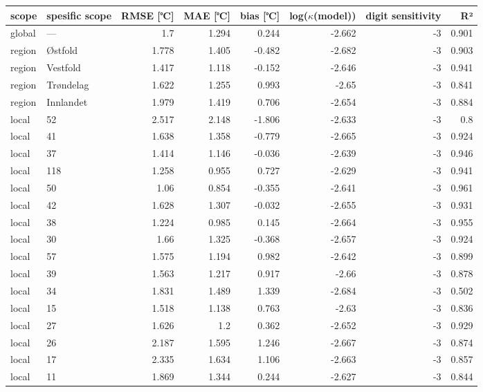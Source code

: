 \begin{tabular}{llrrrrrr}
\hline
 scope   & spesific
scope           &       RMSE
[℃] &   MAE [℃] &        bias
[℃] &   log($\kappa$(model)) &    digit
sensitivity &    R² \\
\hline
 global  & ---       & 1.7   &     1.294 &  0.244 &                 -2.662 & -3 & 0.901 \\
 region  & Østfold   & 1.778 &     1.405 & -0.482 &                 -2.682 & -3 & 0.903 \\
 region  & Vestfold  & 1.417 &     1.118 & -0.152 &                 -2.646 & -3 & 0.941 \\
 region  & Trøndelag & 1.622 &     1.255 &  0.993 &                 -2.65  & -3 & 0.841 \\
 region  & Innlandet & 1.979 &     1.419 &  0.706 &                 -2.654 & -3 & 0.884 \\
 local   & 52        & 2.517 &     2.148 & -1.806 &                 -2.633 & -3 & 0.8   \\
 local   & 41        & 1.638 &     1.358 & -0.779 &                 -2.665 & -3 & 0.924 \\
 local   & 37        & 1.414 &     1.146 & -0.036 &                 -2.639 & -3 & 0.946 \\
 local   & 118       & 1.258 &     0.955 &  0.727 &                 -2.629 & -3 & 0.941 \\
 local   & 50        & 1.06  &     0.854 & -0.355 &                 -2.641 & -3 & 0.961 \\
 local   & 42        & 1.628 &     1.307 & -0.032 &                 -2.655 & -3 & 0.931 \\
 local   & 38        & 1.224 &     0.985 &  0.145 &                 -2.664 & -3 & 0.955 \\
 local   & 30        & 1.66  &     1.325 & -0.368 &                 -2.657 & -3 & 0.924 \\
 local   & 57        & 1.575 &     1.194 &  0.982 &                 -2.642 & -3 & 0.899 \\
 local   & 39        & 1.563 &     1.217 &  0.917 &                 -2.66  & -3 & 0.878 \\
 local   & 34        & 1.831 &     1.489 &  1.339 &                 -2.684 & -3 & 0.502 \\
 local   & 15        & 1.518 &     1.138 &  0.763 &                 -2.63  & -3 & 0.836 \\
 local   & 27        & 1.626 &     1.2   &  0.362 &                 -2.652 & -3 & 0.929 \\
 local   & 26        & 2.187 &     1.595 &  1.246 &                 -2.667 & -3 & 0.874 \\
 local   & 17        & 2.335 &     1.634 &  1.106 &                 -2.663 & -3 & 0.857 \\
 local   & 11        & 1.869 &     1.344 &  0.244 &                 -2.627 & -3 & 0.844 \\
\hline
\end{tabular}